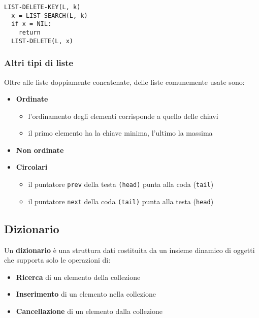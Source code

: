 \documentclass[italian, 10pt]{article}
\begin{document}
\begin{lstlisting}[style=pseudocode, caption={Pseudocodice dell'algoritmo \texttt{LIST-DELETE-KEY}}, label={lst:list-delete-key}]
LIST-DELETE-KEY(L, k)
  x = LIST-SEARCH(L, k)
  if x = NIL:
    return
  LIST-DELETE(L, x)
\end{lstlisting}

\subsubsection{Altri tipi di liste}

Oltre alle liste doppiamente concatenate, delle liste comunemente usate sono:

\begin{itemize}
  \item \textbf{Ordinate}
        \begin{itemize}
          \item l'ordinamento degli elementi corrisponde a quello delle chiavi
          \item il primo elemento ha la chiave minima, l'ultimo la massima
        \end{itemize}
  \item \textbf{Non ordinate}
  \item \textbf{Circolari}
        \begin{itemize}
          \item il puntatore \texttt{prev} della testa \texttt{(\texttt{head})} punta alla coda (\texttt{tail})
          \item il puntatore \texttt{next} della coda \texttt{(\texttt{tail})} punta alla testa (\texttt{head})
        \end{itemize}
\end{itemize}

\subsection{Dizionario}

Un \textbf{dizionario} è una struttura dati costituita da un insieme dinamico di oggetti che supporta solo le operazioni di:

\begin{itemize}
  \item \textbf{Ricerca} di un elemento della collezione
  \item \textbf{Inserimento} di un elemento nella collezione
  \item \textbf{Cancellazione} di un elemento dalla collezione
\end{itemize}
\end{document}
